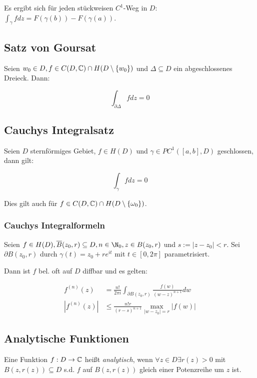 Es ergibt sich für jeden stückweisen $C^1$-Weg in $D$: $\int_\gamma f dz = F(\gamma(b)) - F(\gamma(a))$.

\subsection*{Satz von Goursat}

Seien $w_0 \in D, f \in C(D,\mathbb{C}) \cap H(D \setminus \{w_0\})$ und $\Delta \subseteq D$ ein abgeschlossenes Dreieck. Dann:

\vspace*{-2mm}
$$\int_{\partial\Delta} f dz = 0$$

\subsection*{Cauchys Integralsatz}

Seien $D$ sternförmiges Gebiet, $f \in H(D)$ und $\gamma \in PC^1([a,b],D)$ geschlossen, dann gilt:

\vspace*{-2mm}
$$\int_\gamma f dz = 0$$

Dies gilt auch für $f \in C(D,\mathbb{C}) \cap H(D\setminus \{\omega_0\})$.

\subsubsection*{Cauchys Integralformeln}

Seien $f \in H(D), \overline B(z_0,r) \subseteq D, n \in \N_0, z \in B(z_0,r)$ und $s := |z-z_0| < r$. Sei $\partial B(z_0,r)$ durch $\gamma(t) = z_0 + re^{it}$ mit $t \in [0,2\pi]$ parametrisiert.

Dann ist $f$ bel. oft auf $D$ diffbar und es gelten:

\vspace*{-4mm}
\begin{align*}
	f^{(n)}(z) &= \frac{n!}{2\pi i} \int_{\partial B(z_0,r)} \frac{f(w)}{(w-z)^{n+1}} dw \\
	|f^{(n)}(z)| &\leq \frac{n!r}{(r-s)^{n+1}} \max_{|w-z_0|=r} |f(w)|
\end{align*}

\subsection*{Analytische Funktionen}

Eine Funktion $f : D \to \mathbb{C}$ heißt \emph{analytisch}, wenn $\forall z \in D \exists r(z) > 0$ mit $B(z,r(z)) \subseteq D$ s.d. $f$ auf $B(z,r(z))$ gleich einer Potenzreihe um $z$ ist.

